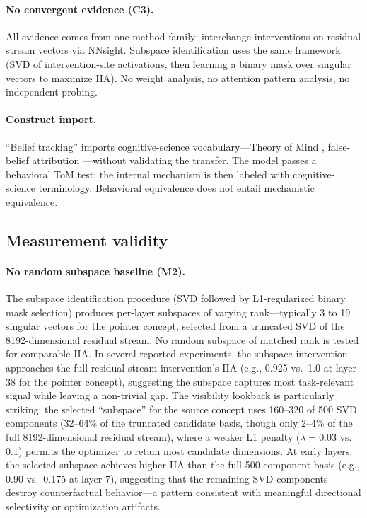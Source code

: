 \documentclass[11pt]{article}
\begin{document}
\paragraph{No convergent evidence (C3).}
All evidence comes from one method family: interchange interventions on residual stream vectors via NNsight. Subspace identification uses the same framework (SVD of intervention-site activations, then learning a binary mask over singular vectors to maximize IIA). No weight analysis, no attention pattern analysis, no independent probing.

\paragraph{Construct import.}
``Belief tracking'' imports cognitive-science vocabulary---Theory of Mind \citep{premack1978chimpanzee}, false-belief attribution \citep{wimmer1983beliefs}---without validating the transfer. The model passes a behavioral ToM test; the internal mechanism is then labeled with cognitive-science terminology. Behavioral equivalence does not entail mechanistic equivalence.

\subsection{Measurement validity}

\paragraph{No random subspace baseline (M2).}
The subspace identification procedure (SVD followed by L1-regularized binary mask selection) produces per-layer subspaces of varying rank---typically 3 to 19 singular vectors for the pointer concept, selected from a truncated SVD of the 8192-dimensional residual stream. No random subspace of matched rank is tested for comparable IIA. In several reported experiments, the subspace intervention approaches the full residual stream intervention's IIA (e.g., 0.925 vs.\ 1.0 at layer 38 for the pointer concept), suggesting the subspace captures most task-relevant signal while leaving a non-trivial gap. The visibility lookback is particularly striking: the selected ``subspace'' for the source concept uses 160--320 of 500 SVD components (32--64\% of the truncated candidate basis, though only 2--4\% of the full 8192-dimensional residual stream), where a weaker L1 penalty ($\lambda = 0.03$ vs.\ $0.1$) permits the optimizer to retain most candidate dimensions. At early layers, the selected subspace achieves higher IIA than the full 500-component basis (e.g., 0.90 vs.\ 0.175 at layer 7), suggesting that the remaining SVD components destroy counterfactual behavior---a pattern consistent with meaningful directional selectivity or optimization artifacts.
\end{document}
